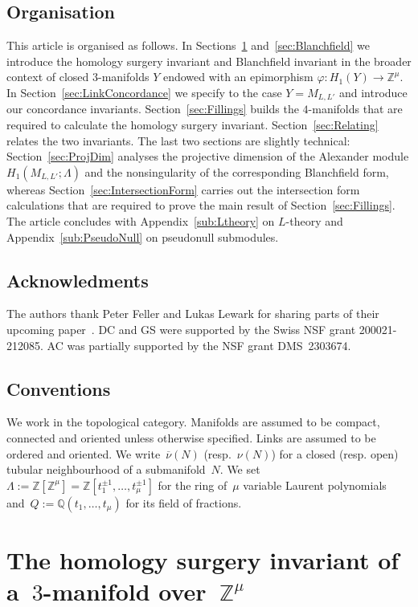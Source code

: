 \documentclass[10.9pt,a4paper]{amsart}
\theoremstyle{definition}
\theoremstyle{remark}
\newcommand{\Z}{\mathbb{Z}}
\newcommand{\Q}{\mathbb{Q}}
\begin{document}
\subsection*{Organisation}
This article is organised as follows.
In Sections~\ref{sec:HomologySurgeryInvariant} and~\ref{sec:Blanchfield} we introduce the homology surgery invariant and Blanchfield invariant in the broader context of closed $3$-manifolds $Y$ endowed with an epimorphism $\varphi \colon H_1(Y) \to \Z^\mu$.
In Section~\ref{sec:LinkConcordance} we specify to the case $Y=M_{L,L'}$ and introduce our concordance invariants.
Section~\ref{sec:Fillings} builds the $4$-manifolds that are required to calculate the homology surgery invariant.
Section~\ref{sec:Relating} relates the two invariants.
The last two sections are slightly technical: Section~\ref{sec:ProjDim} analyses the projective dimension of the Alexander module $H_1(M_{L,L'};\Lambda)$ and the nonsingularity of the corresponding Blanchfield form, whereas Section~\ref{sec:IntersectionForm} carries out the intersection form calculations that are required to prove the main result of Section~\ref{sec:Fillings}.
The article concludes with Appendix~\ref{sub:Ltheory} on $L$-theory and Appendix~\ref{sub:PseudoNull} on pseudonull submodules.


\subsection*{Acknowledments}
The authors thank Peter Feller and Lukas Lewark for sharing parts of their upcoming paper~\cite{FL26}.
DC and GS were supported by the Swiss NSF grant 200021-212085.
AC was partially supported by the NSF grant DMS~2303674.


\subsection*{Conventions}

We work in the topological category.
Manifolds are assumed to be compact, connected and oriented unless otherwise specified.
Links are assumed to be ordered and oriented.
We write~$\overline{\nu}(N)$ (resp.~$\nu(N)$) for a closed (resp. open) tubular neighbourhood of a submanifold~$N$.
We set $\Lambda:=\Z[\Z^\mu]=\Z[t_1^{\pm 1},\ldots,t_\mu^{\pm 1}]$ for the ring of~$\mu$ variable Laurent polynomials
and~$Q:=\Q(t_1,\ldots,t_\mu)$ for its field of fractions.


\section{The homology surgery invariant of a~$3$-manifold over~$\Z^\mu$}
\label{sec:HomologySurgeryInvariant}
\end{document}
